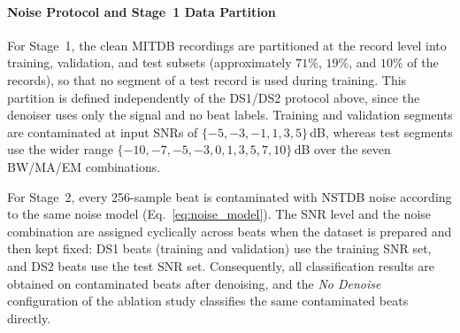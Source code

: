 \paragraph*{Noise Protocol and Stage~1 Data Partition}
For Stage~1, the clean MITDB recordings are partitioned at the record level into training, validation, and test subsets (approximately $71\%$, $19\%$, and $10\%$ of the records), so that no segment of a test record is used during training. This partition is defined independently of the DS1/DS2 protocol above, since the denoiser uses only the signal and no beat labels. Training and validation segments are contaminated at input SNRs of $\{-5,-3,-1,1,3,5\}$\,dB, whereas test segments use the wider range $\{-10,-7,-5,-3,0,1,3,5,7,10\}$\,dB over the seven BW/MA/EM combinations.

For Stage~2, every 256-sample beat is contaminated with NSTDB noise according to the same noise model (Eq.~\eqref{eq:noise_model}). The SNR level and the noise combination are assigned cyclically across beats when the dataset is prepared and then kept fixed: DS1 beats (training and validation) use the training SNR set, and DS2 beats use the test SNR set. Consequently, all classification results are obtained on contaminated beats after denoising, and the \emph{No Denoise} configuration of the ablation study classifies the same contaminated beats directly.

\begin{table}[!htbp]
\caption{Beat Distributions Across the Inter-Patient DS1/DS2 Split (AAMI Classes N, S, V)}
\label{tab:ds_split}
\centering
{}
\end{table}

